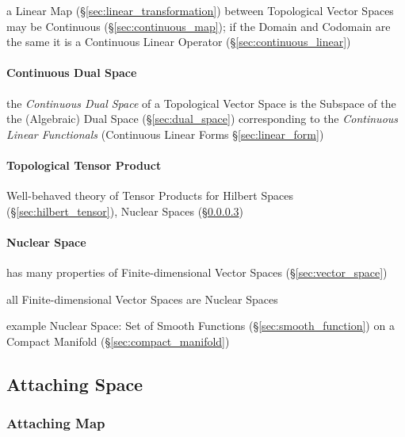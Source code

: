 a Linear Map (\S\ref{sec:linear_transformation}) between Topological Vector
Spaces may be Continuous (\S\ref{sec:continuous_map}); if the Domain
and Codomain are the same it is a Continuous Linear Operator
(\S\ref{sec:continuous_linear})



\paragraph{Continuous Dual Space}\label{sec:continuous_dual_space}
\hfill

the \emph{Continuous Dual Space} of a Topological Vector Space is the Subspace
of the the (Algebraic) Dual Space (\S\ref{sec:dual_space}) corresponding to the
\emph{Continuous Linear Functionals} (Continuous Linear Forms
\S\ref{sec:linear_form})



\paragraph{Topological Tensor Product}\label{sec:topological_tensor}
\hfill

Well-behaved theory of Tensor Products for Hilbert Spaces
(\S\ref{sec:hilbert_tensor}), Nuclear Spaces
(\S\ref{sec:nuclear_space})



\paragraph{Nuclear Space}\label{sec:nuclear_space}\hfill

has many properties of Finite-dimensional Vector Spaces
(\S\ref{sec:vector_space})

all Finite-dimensional Vector Spaces are Nuclear Spaces

example Nuclear Space: Set of Smooth Functions
(\S\ref{sec:smooth_function}) on a Compact Manifold
(\S\ref{sec:compact_manifold})



\subsection{Attaching Space}\label{sec:attaching_space}

\subsubsection{Attaching Map}\label{sec:attaching_map}

